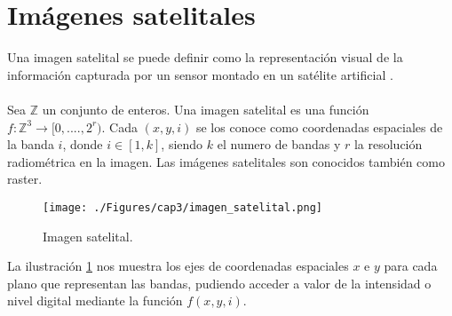 \section{Im\'agenes satelitales}
Una imagen satelital se puede definir como la representaci\'on visual de la informaci\'on capturada por un sensor montado en un sat\'elite artificial \cite{acosta2003experiencia}. \\~\\
Sea $ \mathbb{Z} $ un conjunto de enteros. Una imagen satelital es una funci\'on $ f:\mathbb{Z}^{3} \longrightarrow [0,....,2^{r}) $. Cada $ (x,y,i) $ se los conoce como coordenadas espaciales de la banda $ i $, donde $ i \in [1,k] $, siendo $ k $ el numero de bandas y $ r $ la resoluci\'on radiom\'etrica en la imagen. Las im\'agenes satelitales son conocidos tambi\'en como raster.
  \begin{figure}[H]
  	\centering
  	\texttt{[image: ./Figures/cap3/imagen\_satelital.png]}
  	\caption{Imagen satelital.}
  	\label{fig:imagenMultiespectral}
  \end{figure}
La ilustraci\'on \ref{fig:imagenMultiespectral} nos muestra los ejes de coordenadas espaciales $ x $ e $ y $ para cada plano que representan las bandas, pudiendo acceder a valor de la intensidad o nivel digital mediante la funci\'on $ f(x,y,i) $.


